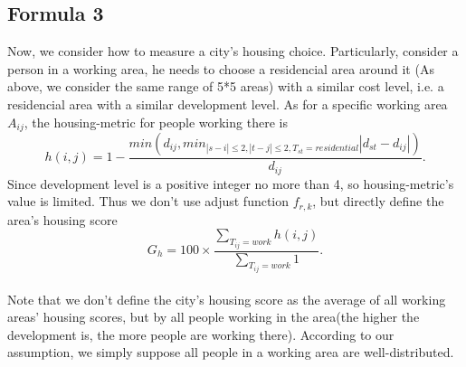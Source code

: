 \subsection{Formula 3}
Now, we consider how to measure a city's housing choice.
Particularly, consider a person in a working area, he needs to choose a residencial area around it (As above, we consider the same range of 5*5 areas) with a similar cost level, i.e. a residencial area with a similar development level.
As for a specific working area $ A_{ij} $, the housing-metric for people working there is $$ h(i,j) = 1 - \frac{min(d_{ij}, min_{|s-i|\leq 2, |t-j|\leq 2, T_{st}=residential} |d_{st} - d_{ij}|)}{d_{ij}}. $$
Since development level is a positive integer no more than 4, so housing-metric's value is limited.
Thus we don't use adjust function $ f_{r,k} $, but directly define the area's housing score $$ G_h = 100 \times \frac{\sum_{T_{ij}=work} h(i,j)}{\sum_{T_{ij}=work} 1}. $$
\\
Note that we don't define the city's housing score as the average of all working areas' housing scores, but by all people working in the area(the higher the development is, the more people are working there).
According to our assumption, we simply suppose all people in a working area are well-distributed.
\\

